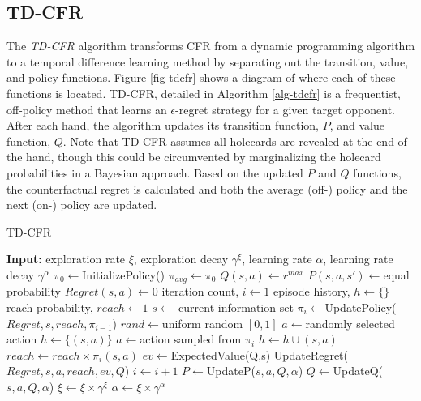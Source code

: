 \documentclass{aamas2013}
\begin{document}
    \subsection{TD-CFR}
    The \textit{TD-CFR} algorithm transforms CFR from a dynamic programming algorithm to a temporal difference learning method by separating out the transition, value, and policy functions. Figure \ref{fig-tdcfr} shows a diagram of where each of these functions is located. TD-CFR, detailed in Algorithm \ref{alg-tdcfr} is a frequentist, off-policy method that learns an $\epsilon$-regret strategy for a given target opponent. After each hand, the algorithm updates its transition function, $P$, and value function, $Q$. Note that TD-CFR assumes all holecards are revealed at the end of the hand, though this could be circumvented by marginalizing the holecard probabilities in a Bayesian approach. Based on the updated $P$ and $Q$ functions, the counterfactual regret is calculated and both the average (off-) policy and the next (on-) policy are updated.


    \begin{algorithm}
    \caption{TD-CFR}
    \label{alg-tdcfr}
    \begin{algorithmic}
    \STATE \textbf{Input:} exploration rate $\xi$, exploration decay $\gamma^{\xi}$, learning rate $\alpha$, learning rate decay $\gamma^{\alpha}$
    \STATE $\pi_0 \leftarrow$InitializePolicy()
    \STATE $\pi_{avg} \leftarrow \pi_0$
        \STATE $Q(s,a) \leftarrow r^{max}$
        \STATE $P(s,a,s') \leftarrow$equal probability
        \STATE $Regret(s,a) \leftarrow 0$
    \ENDFOR
    \STATE iteration count, $i \leftarrow 1$
    \LOOP
        \STATE episode history, $h \leftarrow \{\}$
        \STATE reach probability, $reach \leftarrow 1$
          \STATE $s \leftarrow$ current information set
          \STATE $\pi_{i} \leftarrow$UpdatePolicy($Regret, s, reach, \pi_{i-1}$)
          \STATE $rand \leftarrow$uniform random $[0,1]$
            \STATE $a \leftarrow$randomly selected action
            \STATE $h \leftarrow \{(s,a)\}$
          \ELSE
            \STATE $a \leftarrow$action sampled from $\pi_i$
            \STATE $h \leftarrow h \cup (s,a)$
          \ENDIF
          \STATE $reach \leftarrow reach \times \pi_i(s,a)$
          \STATE $ev \leftarrow$ExpectedValue(Q,s)
          \STATE UpdateRegret($Regret,s,a,reach,ev,Q$)
          \STATE $i \leftarrow i+1$
        \ENDWHILE
          \STATE $P \leftarrow$UpdateP($s,a,Q,\alpha$)
          \STATE $Q \leftarrow$UpdateQ($s,a,Q,\alpha$)
        \ENDFOR
        \STATE $\xi \leftarrow \xi \times \gamma^{\xi}$
        \STATE $\alpha \leftarrow \xi \times \gamma^{\alpha}$
    \ENDLOOP
    \end{algorithmic}
    \end{algorithm}
\end{document}
